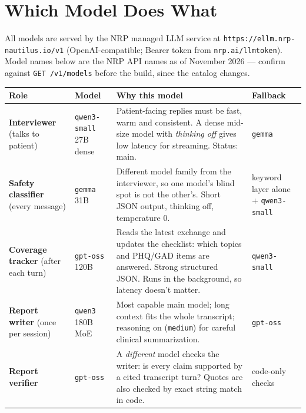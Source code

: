 \documentclass[11pt]{article}
\newcommand{\model}[1]{\texttt{\textcolor{model}{#1}}}
\begin{document}
\section{Which Model Does What}
\label{sec:models}

All models are served by the NRP managed LLM service at \texttt{https://ellm.nrp-nautilus.io/v1}
(OpenAI-compatible; Bearer token from \texttt{nrp.ai/llmtoken}). Model names below are the NRP API names as of November 2026 ---
confirm against \texttt{GET /v1/models} before the build, since the catalog changes.

\medskip
\renewcommand{\arraystretch}{1.3}
\small
\begin{tabularx}{\textwidth}{@{}>{\raggedright}p{2.5cm} >{\raggedright}p{2.3cm} X >{\raggedright\arraybackslash}p{2.2cm}@{}}
\toprule
\textbf{Role} & \textbf{Model} & \textbf{Why this model} & \textbf{Fallback} \\
\midrule
\textbf{Interviewer} (talks to patient) & \model{qwen3-small} \newline 27B dense & Patient-facing replies must be fast, warm and consistent. A dense mid-size model with \emph{thinking off} gives low latency for streaming. Status: main. & \model{gemma} \\
\textbf{Safety classifier} (every message) & \model{gemma} \newline 31B & Different model family from the interviewer, so one model's blind spot is not the other's. Short JSON output, thinking off, temperature 0. & keyword layer alone + \model{qwen3-small} \\
\textbf{Coverage tracker} (after each turn) & \model{gpt-oss} \newline 120B & Reads the latest exchange and updates the checklist: which topics and PHQ/GAD items are answered. Strong structured JSON. Runs in the background, so latency doesn't matter. & \model{qwen3-small} \\
\textbf{Report writer} (once per session) & \model{qwen3} \newline 180B MoE & Most capable main model; long context fits the whole transcript; reasoning on (\texttt{medium}) for careful clinical summarization. & \model{gpt-oss} \\
\textbf{Report verifier} & \model{gpt-oss} & A \emph{different} model checks the writer: is every claim supported by a cited transcript turn? Quotes are also checked by exact string match in code. & code-only checks \\

\end{tabularx}
\end{document}
